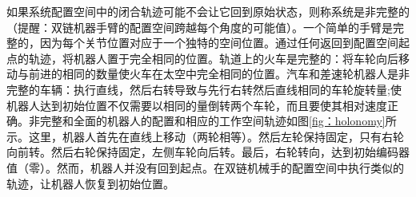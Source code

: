 
如果系统配置空间中的闭合轨迹可能不会让它回到原始状态，则称系统是非完整的（提醒：双链机器手臂的配置空间跨越每个角度的可能值）。一个简单的手臂是完整的，因为每个关节位置对应于一个独特的空间位置。通过任何返回到配置空间起点的轨迹，将机器人置于完全相同的位置。轨道上的火车是完整的：将车轮向后移动与前进的相同的数量使火车在太空中完全相同的位置。汽车和差速轮机器人是非完整的车辆：执行直线，然后右转导致与先行右转然后直线相同的车轮旋转量;使机器人达到初始位置不仅需要以相同的量倒转两个车轮，而且要使其相对速度正确。非完整和全面的机器人的配置和相应的工作空间轨迹如图\ref{fig：holonomy}所示。这里，机器人首先在直线上移动（两轮相等）。然后左轮保持固定，只有右轮向前转。然后右轮保持固定，左侧车轮向后转。最后，右轮转向，达到初始编码器值（零）。然而，机器人并没有回到起点。在双链机械手的配置空间中执行类似的轨迹，让机器人恢复到初始位置。

